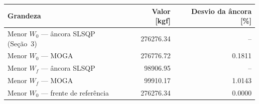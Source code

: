 \begin{tabular}{lrr}
\toprule
Grandeza & Valor [kgf] & Desvio da âncora [\%] \\
\midrule
Menor $W_0$ --- âncora SLSQP (Seção~3) & 276276.34 & -- \\
Menor $W_0$ --- MOGA & 276776.72 & 0.1811 \\
Menor $W_f$ --- âncora SLSQP & 98906.95 & -- \\
Menor $W_f$ --- MOGA & 99910.17 & 1.0143 \\
Menor $W_0$ --- frente de referência & 276276.34 & 0.0000 \\
\bottomrule
\end{tabular}